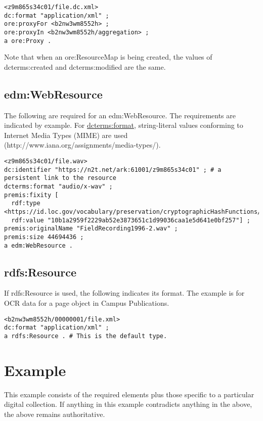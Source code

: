\documentclass[11pt]{article}
\begin{document}
\begin{verbatim}
<z9m865s34c01/file.dc.xml>
dc:format "application/xml" ;
ore:proxyFor <b2nw3wm8552h> ;
ore:proxyIn <b2nw3wm8552h/aggregation> ;
a ore:Proxy .
\end{verbatim}

Note that when an ore:ResourceMap is being created, the values of dcterms:created and dcterms:modified are the same.

\subsection{edm:WebResource}

The following are required for an edm:WebResource. The requirements are indicated by example. For \underline{dcterms:format}, string-literal values conforming to Internet Media Types (MIME) are used (http://www.iana.org/assignments/media-types/).

\begin{verbatim}
<z9m865s34c01/file.wav> 
dc:identifier "https://n2t.net/ark:61001/z9m865s34c01" ; # a persistent link to the resource
dcterms:format "audio/x-wav" ;
premis:fixity [
  rdf:type <https://id.loc.gov/vocabulary/preservation/cryptographicHashFunctions/sha512>;
  rdf:value "10b1a2959f2229ab52e3873651c1d99036caa1e5d641e0bf257"] ;
premis:originalName "FieldRecording1996-2.wav" ;
premis:size 44694436 ;
a edm:WebResource .
\end{verbatim}

\subsection{rdfs:Resource}

If rdfs:Resource is used, the following indicates its format. The example is for OCR data for a page object in Campus Publications.

\begin{verbatim}
<b2nw3wm8552h/00000001/file.xml>
dc:format "application/xml" ;
a rdfs:Resource . # This is the default type. 
\end{verbatim}

\pagebreak[4]
\section{Example}
This example consists of the required elements plus those specific to a particular digital collection. If anything in this example contradicts anything in the above, the above remains authoritative.


\end{document}

